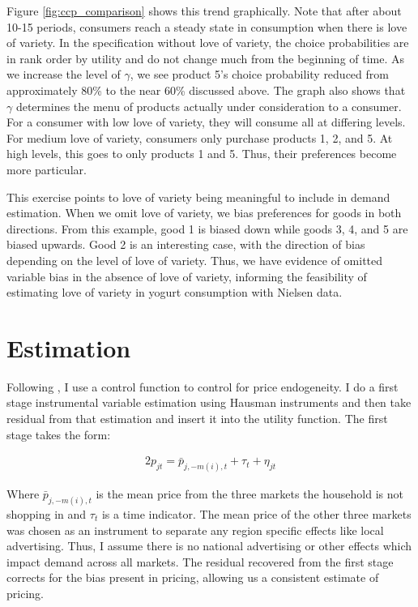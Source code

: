 \documentclass[11pt]{article}
\theoremstyle{definition}
\theoremstyle{remark}
\begin{document}
Figure \ref{fig:ccp_comparison} shows this trend graphically. Note that after about 10-15 periods, consumers reach a steady state in consumption when there is love of variety. In the specification without love of variety, the choice probabilities are in rank order by utility and do not change much from the beginning of time. As we increase the level of $\gamma$, we see product 5's choice probability reduced from approximately 80\% to the near 60\% discussed above. The graph also shows that $\gamma$ determines the menu of products actually under consideration to a consumer. For a consumer with low love of variety, they will consume all at differing levels. For medium love of variety, consumers only purchase products 1, 2, and 5. At high levels, this goes to only products 1 and 5. Thus, their preferences become more particular.

This exercise points to love of variety being meaningful to include in demand estimation. When we omit love of variety, we bias preferences for goods in both directions. From this example, good 1 is biased down while goods 3, 4, and 5 are biased upwards. Good 2 is an interesting case, with the direction of bias depending on the level of love of variety. Thus, we have evidence of omitted variable bias in the absence of love of variety, informing the feasibility of estimating love of variety in yogurt consumption with Nielsen data.

\section{Estimation}

Following \citet{petrin_control_2010}, I use a control function to control for price endogeneity. I do a first stage instrumental variable estimation using Hausman instruments and then take residual from that estimation and insert it into the utility function. The first stage takes the form:

    \begin{alignat*}{2}
      p_{jt} = \bar{p}_{j,-m(i),t} + \tau_t + \eta_{jt}
    \end{alignat*}

    Where $\bar{p}_{j,-m(i),t}$ is the mean price from the three markets the household is not shopping in and $\tau_t$ is a time indicator. The mean price of the other three markets was chosen as an instrument to separate any region specific effects like local advertising. Thus, I assume there is no national advertising or other effects which impact demand across all markets. The residual recovered from the first stage corrects for the bias present in pricing, allowing us a consistent estimate of pricing.
\end{document}
